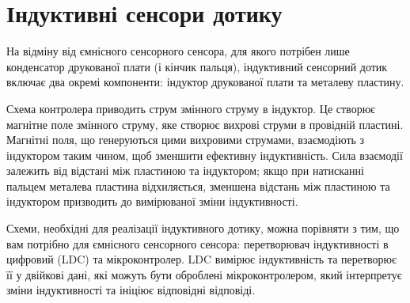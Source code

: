 \documentclass[a4paper,fontsize=12]{report}
\begin{document}
\chapter{Індуктивні сенсори дотику}
  На відміну від ємнісного сенсорного сенсора, для якого потрібен лише конденсатор друкованої плати (і кінчик пальця), індуктивний сенсорний дотик включає два окремі компоненти: індуктор друкованої плати та металеву пластину.\\
  \begin{figure}[ht]
  \end{figure}
  Схема контролера приводить струм змінного струму в індуктор. Це створює магнітне поле змінного струму, яке створює вихрові струми в провідній пластині. Магнітні поля, що генеруються цими вихровими струмами, взаємодіють з індуктором таким чином, щоб зменшити ефективну індуктивність. Сила взаємодії залежить від відстані між пластиною та індуктором; якщо при натисканні пальцем металева пластина відхиляється, зменшена відстань між пластиною та індуктором призводить до вимірюваної зміни індуктивності.

  Схеми, необхідні для реалізації індуктивного дотику, можна порівняти з тим, що вам потрібно для ємнісного сенсорного сенсора: перетворювач індуктивності в цифровий (LDC) та мікроконтролер. LDC вимірює індуктивність та перетворює її у двійкові дані, які можуть бути оброблені мікроконтролером, який інтерпретує зміни індуктивності та ініціює відповідні відповіді.

  \begin{figure}[h]
  \end{figure}
\end{document}
